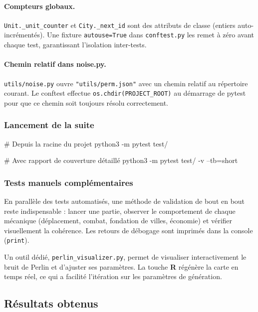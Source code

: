 \documentclass[12pt, a4paper]{article}
\begin{document}
\paragraph{Compteurs globaux.}
\texttt{Unit.\_unit\_counter} et \texttt{City.\_next\_id} sont des attributs de classe
(entiers auto-incrémentés). Une fixture \texttt{autouse=True} dans \texttt{conftest.py}
les remet à zéro avant chaque test, garantissant l'isolation inter-tests.

\paragraph{Chemin relatif dans noise.py.}
\texttt{utils/noise.py} ouvre \texttt{"utils/perm.json"} avec un chemin relatif au
répertoire courant. Le conftest effectue \texttt{os.chdir(PROJECT\_ROOT)} au démarrage de
pytest pour que ce chemin soit toujours résolu correctement.


\subsubsection{Lancement de la suite}

\begin{myverbatim}[title={Commande de lancement des tests}]
# Depuis la racine du projet
python3 -m pytest test/

# Avec rapport de couverture détaillé
python3 -m pytest test/ -v --tb=short
\end{myverbatim}

\subsubsection{Tests manuels complémentaires}

En parallèle des tests automatisés, une méthode de validation de bout en bout reste
indispensable : lancer une partie, observer le comportement de chaque mécanique
(déplacement, combat, fondation de villes, économie) et vérifier visuellement la cohérence.
Les retours de débogage sont imprimés dans la console (\texttt{print}).

Un outil dédié, \texttt{perlin\_visualizer.py}, permet de visualiser interactivement le
bruit de Perlin et d'ajuster ses paramètres. La touche \textbf{R} régénère la carte en
temps réel, ce qui a facilité l'itération sur les paramètres de génération.

\subsection{Résultats obtenus}
\end{document}
